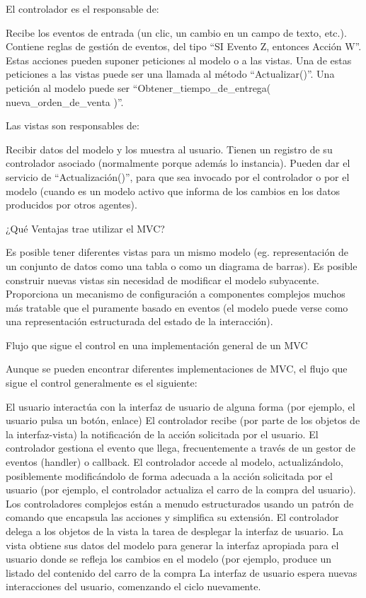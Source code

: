 El controlador es el responsable de:

    Recibe los eventos de entrada (un clic, un cambio en un campo de texto, etc.).
    Contiene reglas de gestión de eventos, del tipo “SI Evento Z, entonces Acción W”. Estas acciones pueden suponer peticiones al 
    modelo o a las vistas. Una de estas peticiones a las vistas puede ser una llamada al método “Actualizar()”. Una petición al modelo 
    puede ser “Obtener_tiempo_de_entrega( nueva_orden_de_venta )”.

Las vistas son responsables de:

    Recibir datos del modelo y los muestra al usuario.
    Tienen un registro de su controlador asociado (normalmente porque además lo instancia).
    Pueden dar el servicio de “Actualización()”, para que sea invocado por el controlador o por el modelo (cuando es un modelo activo que 
    informa de los cambios en los datos producidos por otros agentes).

¿Qué Ventajas trae utilizar el MVC?

    Es posible tener diferentes vistas para un mismo modelo (eg. representación de un conjunto de datos como una tabla o como un diagrama 
    de barras).
    Es posible construir nuevas vistas sin necesidad de modificar el modelo subyacente.
    Proporciona un mecanismo de configuración a componentes complejos muchos más tratable que el puramente basado en eventos (el modelo 
    puede verse como una representación estructurada del estado de la interacción).
    

Flujo que sigue el control en una implementación general de un MVC

Aunque se pueden encontrar diferentes implementaciones de MVC, el flujo que sigue el control generalmente es el siguiente:

    El usuario interactúa con la interfaz de usuario de alguna forma (por ejemplo, el usuario pulsa un botón, enlace)
    El controlador recibe (por parte de los objetos de la interfaz-vista) la notificación de la acción solicitada por el usuario. El controlador gestiona el evento que llega, frecuentemente a través de un gestor de eventos (handler) o callback.
    El controlador accede al modelo, actualizándolo, posiblemente modificándolo de forma adecuada a la acción solicitada por el usuario (por ejemplo, el controlador actualiza el carro de la compra del usuario). Los controladores complejos están a menudo estructurados usando un patrón de comando que encapsula las acciones y simplifica su extensión.
    El controlador delega a los objetos de la vista la tarea de desplegar la interfaz de usuario. La vista obtiene sus datos del modelo para generar la interfaz apropiada para el usuario donde se refleja los cambios en el modelo (por ejemplo, produce un listado del contenido del carro de la compra
    La interfaz de usuario espera nuevas interacciones del usuario, comenzando el ciclo nuevamente.
